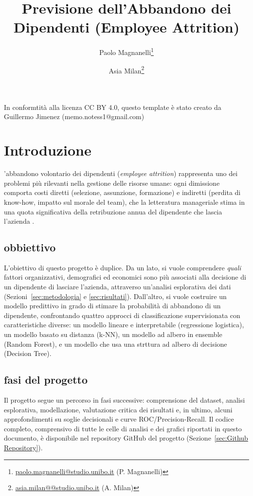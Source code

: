 \documentclass[9pt,a4paper,twocolumn,twoside]{tau-class/tau}
\title{Previsione dell'Abbandono dei Dipendenti (Employee Attrition)}
\author[a,1]{Paolo Magnanelli\thanks{\href{mailto:paolo.magnanelli@studio.unibo.it}{paolo.magnanelli@studio.unibo.it} (P. Magnanelli)}}
\author[a,2]{Asia Milan\thanks{\href{mailto:asia.milan@@studio.unibo.it}{asia.milan@@studio.unibo.it} (A. Milan)}}
\affil[a]{Università di Bologna}
\begin{document}
		
    \maketitle 
    \thispagestyle{firststyle}
    

\begin{note}
    In conformtità alla licenza CC BY 4.0, questo template è stato creato da Guillermo Jimenez (memo.notess1@gmail.com)
\end{note}

\section{Introduzione}
'abbandono volontario dei dipendenti (\emph{employee attrition}) rappresenta uno dei problemi più rilevanti nella gestione delle risorse umane: ogni dimissione comporta costi diretti (selezione, assunzione, formazione) e indiretti (perdita di know-how, impatto sul morale del team), che la letteratura manageriale stima in una quota significativa della retribuzione
annua del dipendente che lascia l'azienda \cite{allen2010retention}.

\subsection{obbiettivo}
L'obiettivo di questo progetto è duplice. Da un lato, si vuole comprendere \emph{quali} fattori organizzativi, demografici ed economici sono più associati alla decisione di un dipendente di lasciare l'azienda, attraverso un'analisi esplorativa dei dati (Sezioni~\ref{sec:metodologia} e \ref{sec:risultati}). Dall'altro, si vuole costruire un modello predittivo in grado di stimare la probabilità di abbandono di un dipendente, confrontando quattro approcci di classificazione supervisionata con caratteristiche diverse: un modello lineare e interpretabile (regressione logistica), un modello basato su distanza (k-NN), un modello ad albero in ensemble (Random Forest), e un modello che usa una strttura ad albero di decisione (Decision Tree).

\subsection{fasi del progetto}
Il progetto segue un percorso in fasi successive: comprensione del dataset, analisi esplorativa, modellazione, valutazione critica dei risultati e, in ultimo, alcuni approfondimenti su soglie decisionali e curve ROC/Precision-Recall. Il codice completo, comprensivo di tutte le celle di analisi e dei grafici riportati in questo documento, è disponibile nel repository GitHub del progetto (Sezione~\ref{sec:Github Repository}).
\end{document}
